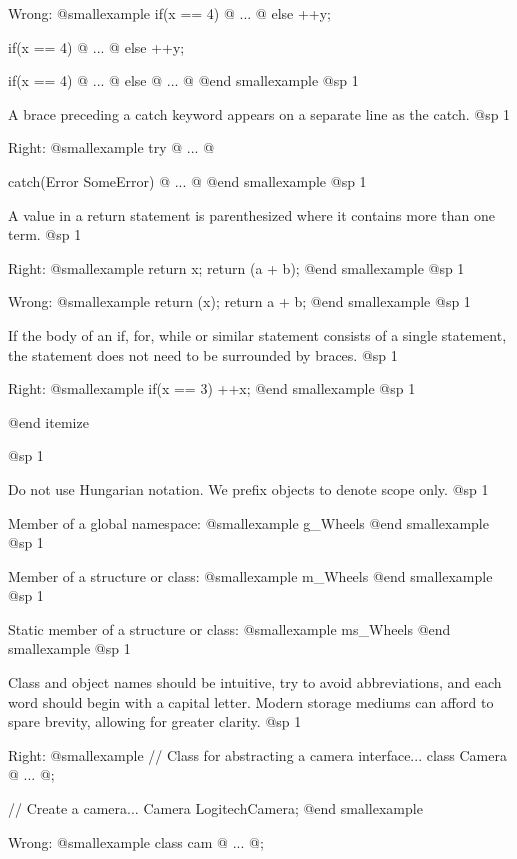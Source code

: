 Wrong:
@smallexample
if(x == 4) @{
    ...
@}
else ++y;

if(x == 4) @{
    ...
@} else ++y;

if(x == 4) @{
    ...
@}
else @{
    ...
@}
@end smallexample
@sp 1

\item
A brace preceding a catch keyword appears on a separate line as the catch. 
@sp 1

Right:
@smallexample
try
@{
    ...
@}

catch(Error SomeError)
@{
    ...
@}
@end smallexample
@sp 1

\item
A value in a return statement is parenthesized where it contains more than one term.
@sp 1

Right:
@smallexample
return x;
return (a + b);
@end smallexample
@sp 1

Wrong:
@smallexample
return (x);
return a + b;
@end smallexample
@sp 1

\item
If the body of an if, for, while or similar statement consists of a single statement, the statement does not need to be surrounded by braces.
@sp 1

Right:
@smallexample
if(x == 3)
  ++x;
@end smallexample
@sp 1

@end itemize

@sp 1

\itemize
\item
Do not use Hungarian notation. We prefix objects to denote scope only.
@sp 1

Member of a global namespace:
@smallexample
g_Wheels
@end smallexample
@sp 1

Member of a structure or class:
@smallexample
m_Wheels
@end smallexample
@sp 1

Static member of a structure or class:
@smallexample
ms_Wheels
@end smallexample
@sp 1

\item
Class and object names should be intuitive, try to avoid abbreviations, and each word should begin with a capital letter. Modern storage mediums can afford to spare brevity, allowing for greater clarity.
@sp 1

Right:
@smallexample
// Class for abstracting a camera interface...
class Camera
@{
    ...
@};

// Create a camera...
Camera LogitechCamera;
@end smallexample

Wrong:
@smallexample
class cam
@{
    ...
@};

